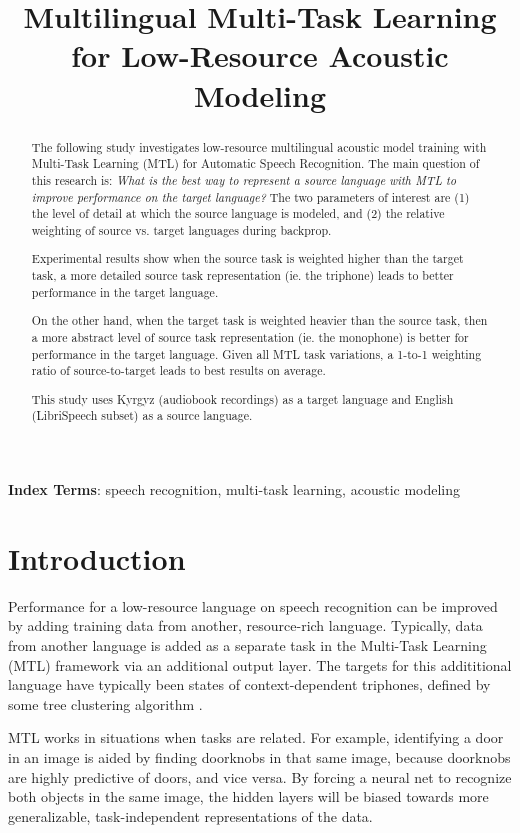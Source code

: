 \documentclass[a4paper]{article}
\title{Multilingual Multi-Task Learning for Low-Resource Acoustic Modeling}
\begin{document}
\maketitle
% 
\begin{abstract}

  The following study investigates low-resource multilingual acoustic model training with Multi-Task Learning (MTL) for Automatic Speech Recognition. The main question of this research is: \textit{What is the best way to represent a source language with MTL to improve performance on the target language?} The two parameters of interest are (1) the level of detail at which the source language is modeled, and (2) the relative weighting of source vs. target languages during backprop.

Experimental results show when the source task is weighted higher than the target task, a more detailed source task representation (ie. the triphone) leads to better performance in the target language.

On the other hand, when the target task is weighted heavier than the source task, then a more abstract level of source task representation (ie. the monophone) is better for performance in the target language. Given all MTL task variations, a 1-to-1 weighting ratio of source-to-target leads to best results on average.

This study uses Kyrgyz (audiobook recordings) as a target language and English (LibriSpeech subset) as a source language.
\end{abstract}

\noindent\textbf{Index Terms}: speech recognition, multi-task learning, acoustic modeling





\section{Introduction}

Performance for a low-resource language on speech recognition can be improved by adding training data from another, resource-rich language. Typically, data from another language is added as a separate task in the Multi-Task Learning (MTL) framework  \cite{caruana1997} via an additional output layer. The targets for this addititional language have typically been states of context-dependent triphones, defined by some tree clustering algorithm \cite{huang2013,heigold2013,grezl2016}.

MTL works in situations when tasks are related. For example, identifying a door in an image is aided by finding doorknobs in that same image, because doorknobs are highly predictive of doors, and vice versa. By forcing a neural net to recognize both objects in the same image, the hidden layers will be biased towards more generalizable, task-independent representations of the data.
\end{document}
